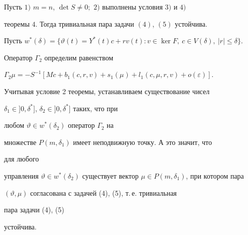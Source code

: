 


\begin{thm} 


Пусть $1)$ $m=n$, $\det S\ne0;$ $2)$ выполнены условия $3)$ и $4)$ 


теоремы $4$. Тогда тривиальная пара задачи $(4)$, $(5)$ устойчива. 


\end{thm} 


 


\begin{pf} 


Пусть $w^*(\delta)=\{\vartheta(t)=Y^*(t)c+r v(t):v\in\ker F,\ c\in 


V(\delta),\ |r|\le\delta\}$. 


Оператор $\Gamma_2$ определим равенством 


$\Gamma_2\mu=-S^{-1}[M c+b_1(c,r,v)+s_1(\mu)+l_1(c,\mu,r,v)+ 


o(\varepsilon)]$. 


Учитывая условие 2 теоремы, устанавливаем существование чисел 


$\delta_1\in]0,\delta^*]$, $\delta_2\in]0,\delta^*]$ таких, что при 


любом $\vartheta\in w^*(\delta_2)$ оператор $\Gamma_2$ на 


множестве $P(m,\delta_1)$ имеет неподвижную точку. А это значит, что 


для любого 


управления $\vartheta\in w^*(\delta_2)$ существует вектор $\mu\in 


P(m,\delta_1)$, при котором пара 


$(\vartheta,\mu)$ согласована с задачей (4), (5), т.\,е. тривиальная 


пара задачи (4), (5) 


устойчива. 


\end{pf} 


 


